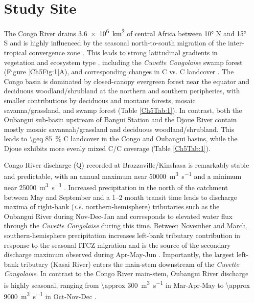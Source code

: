 \section{Study Site}

The Congo River drains \SI{3.6e6}{km^2} of central Africa between \ang{10} N and \ang{15} S and is highly influenced by the seasonal north-to-south migration of the inter-tropical convergence zone \citep[ITCZ;][]{Gasse:2000ul}. This leads to strong latitudinal gradients in vegetation and ecosystem type \citep{Mayaux:2004uw}, including the \textit{Cuvette Congolaise} swamp forest (Figure \ref{Ch5Fig:1}A), and corresponding changes in C vs. C landcover \citep[Figure \ref{Ch5Fig:1}B;][]{Still:2010wh}. The Congo basin is dominated by closed-canopy evergreen forest near the equator and deciduous woodland/shrubland at the northern and southern peripheries, with smaller contributions by deciduous and montane forests, mosaic savanna/grassland, and swamp forest (Table \ref{Ch5Tab:1}). In contrast, both the Oubangui sub-basin upstream of Bangui Station and the Djoue River contain mostly mosaic savannah/grassland and deciduous woodland/shrubland. This leads to \SI{\geq 85}{\%} C landcover in the Congo and Oubangui basins, while the Djoue exhibits more evenly mixed C/C coverage (Table \ref{Ch5Tab:1}).

Congo River discharge (Q) recorded at Brazzaville/Kinshasa is remarkably stable and predictable, with an annual maximum near \SI{50000}{m^3.s^{-1}} and a minimum near \SI{25000}{m^3.s^{-1}} \citep[Figure \ref{Ch5Fig:2}A;][]{Coynel:2005cn,Laraque:2009fz,Spencer:2014vp}. Increased precipitation in the north of the catchment between May and September \citep{Mahe:1993wu} and a \numrange{1}{2} month transit time \citep{Bricquet:1993ve} leads to discharge maxima of right-bank (\textit{i.e.} northern-hemisphere) tributaries such as the Oubangui River during Nov-Dec-Jan \citep{Coynel:2005cn,Bouillon:2012cw,Bouillon:2014ko} and corresponds to elevated water flux through the \textit{Cuvette Congolaise} during this time. Between November and March, southern-hemisphere precipitation increases left-bank tributary contribution in response to the seasonal ITCZ migration and is the source of the secondary discharge maximum observed during Apr-May-Jun \citep[Figure \ref{Ch5Fig:2}A;][]{Bricquet:1993ve,Mahe:1993wu}. Importantly, the largest left-bank tributary (Kasai River) enters the main-stem downstream of the \textit{Cuvette Congolaise}. In contrast to the Congo River main-stem, Oubangui River discharge is highly seasonal, ranging from \SI{\approx 300}{m^3.s^{-1}} in Mar-Apr-May to \SI{\approx 9000}{m^3.s^{-1}} in Oct-Nov-Dec \citep{Bouillon:2012cw,Bouillon:2014ko}.

